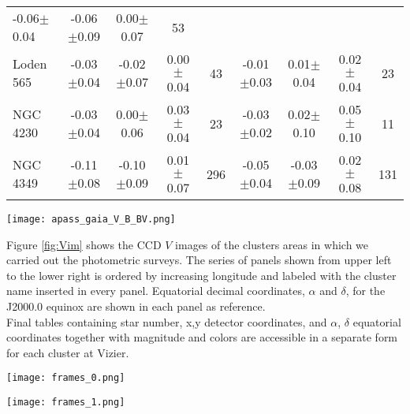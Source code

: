 \documentclass[draft]{aa}
\begin{document}
\begin{table*}[ht]
\begin{tabular}{lcccc|cccc}
-0.06$\pm$0.04 & -0.06$\pm$0.09 & 0.00$\pm$0.07 & 53\\
Loden 565 & -0.03$\pm$0.04 & -0.02$\pm$0.07 & 0.00$\pm$0.04 & 43 &
-0.01$\pm$0.03 & 0.01$\pm$0.04 & 0.02$\pm$0.04 & 23\\
NGC 4230  & -0.03$\pm$0.04 & 0.00$\pm$0.06 & 0.03$\pm$0.04 & 23 &
-0.03$\pm$0.02 & 0.02$\pm$0.10 & 0.05$\pm$0.10 & 11\\
NGC 4349  & -0.11$\pm$0.08 & -0.10$\pm$0.09 & 0.01$\pm$0.07 & 296 &
-0.05$\pm$0.04 & -0.03$\pm$0.09 & 0.02$\pm$0.08 & 131\\
    \hline
    \end{tabular}
    \label{tab:phot_diffs}
\end{table*}

\begin{figure*}[ht]
    \centering
     \texttt{[image: apass\_gaia\_V\_B\_BV.png]}   
\caption{Top row: Differences between the APASS DR10 data for the $V$
(left), $B$ (center) magnitudes and $(B-V)$ color (right) and our own
photometry. Bottom row: Same for Gaia DR2 data vs. our photometry. Details
in the text.}
    \label{fig:gaia_transf}
\end{figure*}

Figure \ref{fig:Vim} shows the CCD $V$ images of the clusters areas in which we
carried out the photometric surveys. The series of panels shown from upper
left to the lower right is ordered by increasing longitude and labeled
with the cluster name inserted in every panel. Equatorial decimal
coordinates, $\alpha$ and $\delta$, for the J2000.0 equinox are shown in each
panel as reference.\\

Final tables containing star number, x,y detector coordinates, and $\alpha$,
$\delta$ equatorial coordinates together with magnitude and colors are
accessible in a separate form for each cluster at Vizier.

\begin{figure*}[htp]
    \centering
     \texttt{[image: frames\_0.png]}   
\caption{V images (charts) of the observed clusters (names inserted)
ordered from top to bottom and from left to right by increasing 
longitude. Decimal $\alpha$ and $\delta$ coordinates for the 2000 equinox are
indicated. North and east are also shown.}
    \label{fig:Vim}
\end{figure*}

\begin{figure*}[htp]
    \addtocounter{figure}{-1}
    \centering
    \texttt{[image: frames\_1.png]}
    \caption{Continued}
    \label{fig:Vim2}
\end{figure*}
\end{document}
